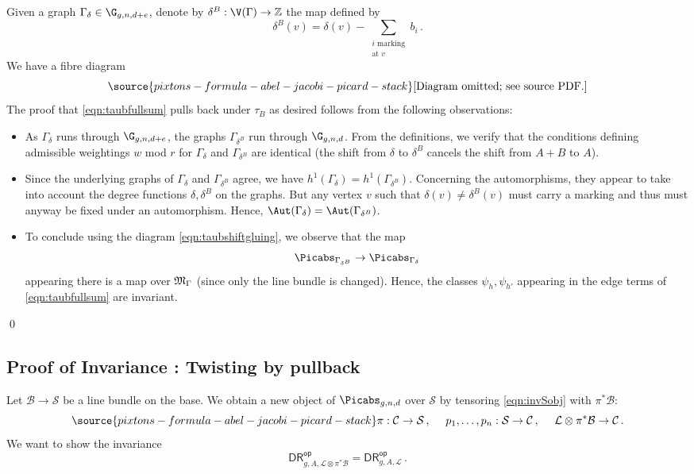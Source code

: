 Given a graph $\Gamma_\delta \in \G_{g,n,d+e}$, denote by $\delta^B : \V(\Gamma) \to \mathbb{Z}$ the map defined by
\[\delta^B(v) = \delta(v) - \sum_{\substack{i\text{ marking}\\\text{at }v}}b_i\, .\]
We have a fibre diagram
\begin{equation} \label{eqn:taubshiftgluing}
\source{pixtons-formula-abel-jacobi-picard-stack}
\text{[Diagram omitted; see source PDF.]}
\end{equation}
The proof that \eqref{eqn:taubfullsum} pulls back under  $\tau_B$ as desired follows from the following observations:
\begin{itemize}
    \item As $\Gamma_\delta$ runs through $\G_{g,n,d+e}$, the graphs $\Gamma_{\delta^B}$ run through $\G_{g,n,d}$. From the definitions, we verify that the conditions defining admissible weightings $w$ mod $r$ for $\Gamma_\delta$ and $\Gamma_{\delta^B}$ are identical (the shift from $\delta$ to $\delta^B$ cancels the shift from $A+B$ to $A$).
    \item Since the underlying graphs of $\Gamma_\delta$ and $\Gamma_{\delta^B}$ agree, we have $h^1(\Gamma_\delta) = h^1(\Gamma_{\delta^B})$. Concerning the automorphisms,
    they appear to take into account the degree functions $\delta, \delta^B$ on the graphs. But any vertex $v$ such that $\delta(v) \neq \delta^B(v)$ must carry a marking and thus must anyway be fixed under an automorphism. Hence, $\Aut(\Gamma_\delta) = \Aut(\Gamma_{\delta^B})$.
    \item To conclude using the diagram \eqref{eqn:taubshiftgluing}, we observe that the map $$\Picabs_{\Gamma_{\delta^B}} \to \Picabs_{\Gamma_\delta}$$ appearing there is a map over $\frak M_{\Gamma}$ (since only the line bundle is changed). Hence, the
    classes $\psi_h, \psi_{h'}$ appearing in the edge terms of \eqref{eqn:taubfullsum} are invariant.
\end{itemize}
\qed

\subsection{Proof of Invariance \invnrII{}: {\rm Twisting by pullback}}
Let $\mathcal{B} \rightarrow \mathcal{S}$ be a line bundle on the
base. We obtain a new object of $\Picabs_{g,n,d}$ over $\mathcal{S}$ by tensoring \eqref{eqn:invSobj} with $\pi^*\mathcal{B}$:
\begin{equation}
\label{eqn:invII}
\source{pixtons-formula-abel-jacobi-picard-stack}
\pi:\mathcal{C} \rightarrow \mathcal{S}\, , \ \ \ \ p_1,\ldots,p_n: \mathcal{S} \rightarrow \mathcal{C}\, , \ \ \ \
\mathcal{L}\otimes \pi^*\mathcal{B} \rightarrow \mathcal{C}\, .
\end{equation}
We want to show the invariance
$$\mathsf{DR}^{\mathsf{op}}_{g,A, \mathcal{L}\otimes\pi^*\mathcal{B}}
=\mathsf{DR}^{\mathsf{op}}_{g,A, \mathcal{L}}
\, . $$


